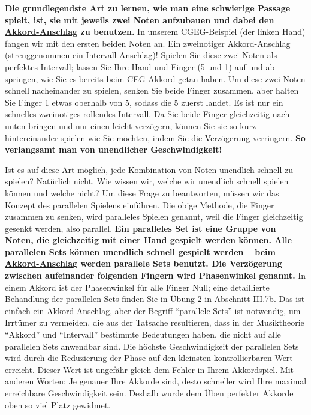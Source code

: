 \textbf{Die grundlegendste Art zu lernen, wie man eine schwierige Passage spielt, ist, sie mit jeweils zwei Noten aufzubauen und dabei den \hyperref[c1ii9]{Akkord-Anschlag} zu benutzen.} In unserem CGEG-Beispiel (der linken Hand) fangen wir mit den ersten beiden Noten an.
Ein zweinotiger Akkord-Anschlag (strenggenommen ein Intervall-Anschlag)!
Spielen Sie diese zwei Noten als perfektes Intervall; lassen Sie Ihre Hand und Finger (5 und 1) auf und ab springen, wie Sie es bereits beim CEG-Akkord getan haben.
Um diese zwei Noten schnell nacheinander zu spielen, senken Sie beide Finger zusammen, aber halten Sie Finger 1 etwas oberhalb von 5, sodass die 5 zuerst landet.
Es ist nur ein schnelles zweinotiges rollendes Intervall.
Da Sie beide Finger gleichzeitig nach unten bringen und nur einen leicht verzögern, können Sie sie so kurz hintereinander spielen wie Sie möchten, indem Sie die Verzögerung verringern.
\textbf{So verlangsamt man von unendlicher Geschwindigkeit!}

Ist es auf diese Art möglich, jede Kombination von Noten unendlich schnell zu spielen? Natürlich nicht.
Wie wissen wir, welche wir unendlich schnell spielen können und welche nicht?
Um diese Frage zu beantworten, müssen wir das Konzept des parallelen Spielens einführen.
Die obige Methode, die Finger zusammen zu senken, wird paralleles Spielen genannt, weil die Finger gleichzeitig gesenkt werden, also parallel.
\textbf{Ein paralleles Set ist eine Gruppe von Noten, die gleichzeitig mit einer Hand gespielt werden können.
Alle parallelen Sets können unendlich schnell gespielt werden -- beim \hyperref[c1ii9]{Akkord-Anschlag} werden parallele Sets benutzt.
Die Verzögerung zwischen aufeinander folgenden Fingern wird Phasenwinkel genannt.}
In einem Akkord ist der Phasenwinkel für alle Finger Null; eine detaillierte Behandlung der parallelen Sets finden Sie in \hyperref[c1iii7b2]{Übung 2 in Abschnitt III.7b}.
Das ist einfach ein Akkord-Anschlag, aber der Begriff \enquote{parallele Sets} ist notwendig, um Irrtümer zu vermeiden, die aus der Tatsache resultieren, dass in der Musiktheorie \enquote{Akkord} und \enquote{Intervall} bestimmte Bedeutungen haben, die nicht auf alle parallelen Sets anwendbar sind.
Die höchste Geschwindigkeit der parallelen Sets wird durch die Reduzierung der Phase auf den kleinsten kontrollierbaren Wert erreicht.
Dieser Wert ist ungefähr gleich dem Fehler in Ihrem Akkordspiel.
Mit anderen Worten: Je genauer Ihre Akkorde sind, desto schneller wird Ihre maximal erreichbare Geschwindigkeit sein.
Deshalb wurde dem Üben perfekter Akkorde oben so viel Platz gewidmet.


